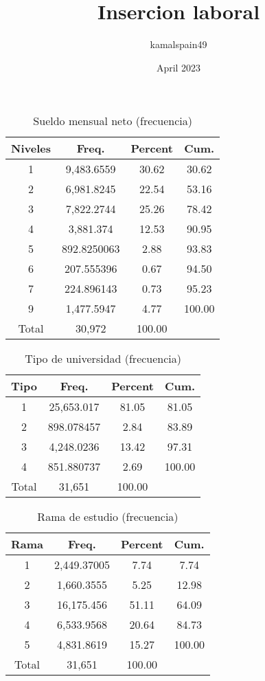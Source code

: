 \documentclass{article}
\title{Insercion laboral}
\author{kamalspain49 }
\date{April 2023}
\begin{document}
\begin{table}[]
\centering
\caption{Sueldo mensual neto (frecuencia)}
\begin{tabular}{c|ccc} \hline \hline
   Niveles & Freq.     & Percent & Cum.  \\ \hline
1          & 9,483.6559  & 30.62     & 30.62          \\
2          & 6,981.8245  & 22.54     & 53.16          \\
3          & 7,822.2744  & 25.26     & 78.42          \\
4          & 3,881.374   & 12.53     & 90.95        \\
5          & 892.8250063 & 2.88      & 93.83         \\
6          & 207.555396  & 0.67      & 94.50         \\
7          & 224.896143  & 0.73      & 95.23         \\
9          & 1,477.5947  & 4.77      & 100.00        \\ 
Total      & 30,972     & 100.00     &   \\ \hline\hline
\end{tabular} 
\end{table} 

\begin{table}[]
\centering
\caption{Tipo de universidad (frecuencia)}
\begin{tabular}{c|ccc} \hline \hline
Tipo         & Freq.  & Percent & Cum. \\ \hline
1 & 25,653.017 & 81.05  & 81.05         \\
2 & 898.078457 & 2.84   & 83.89         \\
3 & 4,248.0236 & 13.42  & 97.31         \\
4 & 851.880737 & 2.69   & 100.00        \\
Total          & 31,651 & 100.00 \\  \hline \hline    
\end{tabular}
\end{table}

\begin{table}[]
\centering
\caption{Rama de estudio (frecuencia)}
\begin{tabular}{c|ccc} \hline \hline
Rama           & Freq.  & Percent & Cum. \\ \hline
1  &2,449.37005 & 7.74   & 7.74         \\
2  & 1,660.3555 & 5.25   & 12.98        \\
3  & 16,175.456 & 51.11  & 64.09        \\
4  & 6,533.9568 & 20.64  & 84.73        \\
5  & 4,831.8619 & 15.27  & 100.00       \\
Total          & 31,651 & 100.00       \\ \hline \hline
\end{tabular}
\end{table}
\end{document}
